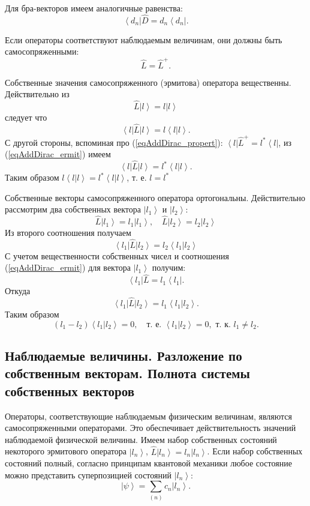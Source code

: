 Для бра-векторов имеем аналогичные равенства:
\begin{equation}
\left<d_n\right| \hat{D}  = d_n \left<d_n\right|.
\end{equation}

Если операторы соответствуют наблюдаемым величинам, они должны быть самосопряженными:
\begin{equation}
\hat{L}  = \hat{L}^{+}.
\label{eqAddDirac_ermit}
\end{equation}

Собственные значения самосопряженного (эрмитова) оператора
вещественны. Действительно из 
\[
\hat{L} \left| l \right> = l \left| l \right>
\]
следует что 
\[
\left< l \right| \hat{L} \left| l \right> = l \left< l \right|
\left. l \right>.
\]
С другой стороны, вспоминая про (\ref{eqAddDirac_propert}):
$\left< l \right| \hat{L}^{+} = l^{*} \left< l \right|$, из
(\ref{eqAddDirac_ermit}) имеем
\[
\left< l \right| \hat{L} \left| l \right> = l^{*} \left< l \right|
\left. l \right>.
\] 
Таким образом $l\left< l \right|
\left. l \right> = l^{*}\left< l \right|
\left. l \right>$, т. е. $l  = l^{*}$

Собственные векторы самосопряженного оператора ортогональны. 
Действительно рассмотрим два собственных вектора 
$\left| l_1 \right>$ и $\left| l_2 \right>$:
\[
\hat{L} \left| l_1 \right> = l_1 \left| l_1 \right>, \quad
\hat{L} \left| l_2 \right> = l_2 \left| l_2 \right>
\]
Из второго соотношения получаем
\[
\left< l_1 \right| \hat{L} \left| l_2 \right> = l_2 \left< l_1 \right| \left. l_2 \right>
\]
С учетом вещественности собственных чисел и соотношения
(\ref{eqAddDirac_ermit}) для вектора $\left| l_1 \right>$ получим:
\[
\left< l_1 \right| \hat{L} = l_1 \left< l_1 \right|.
\]
Откуда
\[
\left< l_1 \right| \hat{L} \left| l_2 \right> = l_1 \left< l_1 \right| \left. l_2 \right>.
\] 
Таким образом
\[
\left(l_1 - l_2\right) \left< l_1 \right| \left. l_2 \right> = 0, 
\quad \mbox{т. е. } \left< l_1 \right| \left. l_2 \right> = 0,
\mbox{ т. к. } l_1 \neq l_2.
\] 

\subsection{Наблюдаемые  величины.  Разложение  по  собственным  векторам.  
Полнота  системы  собственных  векторов}
Операторы, соответствующие наблюдаемым физическим величинам, являются
самосопряженными операторами. Это обеспечивает действительность
значений наблюдаемой физической величины. Имеем набор собственных
состояний некоторого эрмитового  оператора  
$\left| l_n \right>$,  $\hat{L} \left| l_n \right> = l_n \left| l_n
\right>$.  Если набор собственных состояний полный, согласно принципам
квантовой механики любое состояние можно представить суперпозицией
состояний $\left| l_n \right>$:
\begin{equation}  
\left| \psi \right> = \sum_{(n)} c_n \left| l_n \right>.
\end{equation}  

